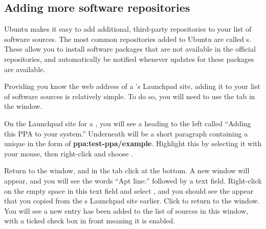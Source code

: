 \subsection{Adding more software repositories}

Ubuntu makes it easy to add additional, third-party repositories to your list of software sources. The most common repositories added to Ubuntu are called s. These allow you to install software packages that are not available in the official repositories, and automatically be notified whenever updates for these packages are available.

Providing you know the web address of a 's Launchpad site, adding it to your list of software sources is relatively simple. To do so, you will need to use the  tab in the  window. 

On the Launchpad site for a , you will see a heading to the left called ``Adding this PPA to your system.'' Underneath will be a short paragraph containing a unique  in the form of \textbf{ppa:test-ppa/example}. Highlight this  by selecting it with your mouse, then right-click and choose .



Return to the  window, and in the  tab click  at the bottom. A new window will appear, and you will see the words ``Apt line:'' followed by a text field. Right-click on the empty space in this text field and select , and you should see the  appear that you copied from the s Launchpad site earlier. Click  to return to the  window. You will see a new entry has been added to the list of sources in this window, with a ticked check box in front meaning it is enabled. 

